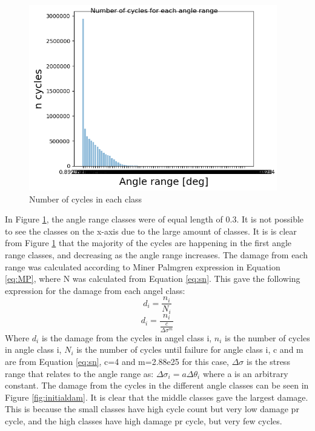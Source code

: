 \begin{figure}[H]
\centering
\includegraphics[scale=0.9]{figures/initialcyc}
\caption[Number of cycles in each class]{Number of cycles in each class}
 \label{fig:initialcyc}
\end{figure}

\noindent In Figure \ref{fig:initialcyc}, the angle range classes were of equal length of 0.3. It is not possible to see the classes on the x-axis due to the large amount of classes. It is is clear from Figure \ref{fig:initialcyc} that the majority of the cycles are happening in the first angle range classes, and decreasing as the angle range increases.\newline
\newline
The damage from each range was calculated according to Miner Palmgren expression in Equation \ref{eq:MP}, where N was calculated from Equation \ref{eq:sn}. This gave the following expression for the damage from each angel class: 
\begin{equation}
    d_i  = \frac{n_i}{N_i}
\end{equation}
\begin{equation}
    d_i=\frac{n_i}{\frac{c}{\Delta \sigma ^m}}
\end{equation}
Where $d_i$ is the damage from the cycles in angel class i, $n_i$ is the number of cycles in angle class i, $N_i$ is the number of cycles until failure for angle class i, c and m are from Equation \ref{eq:sn}, c=4 and m=2.88e25 for this case,  $\Delta \sigma$ is the stress range that relates to the angle range as: $\Delta \sigma_i = a \Delta \theta_i$ where a is an arbitrary constant.\newline
\newline 
The damage from the cycles in the different angle classes can be seen in Figure \ref{fig:initialdam}. It is clear that the middle classes gave the largest damage. This is because the small classes have high cycle count but very low damage pr cycle, and the high classes have high damage pr cycle, but very few cycles. 

